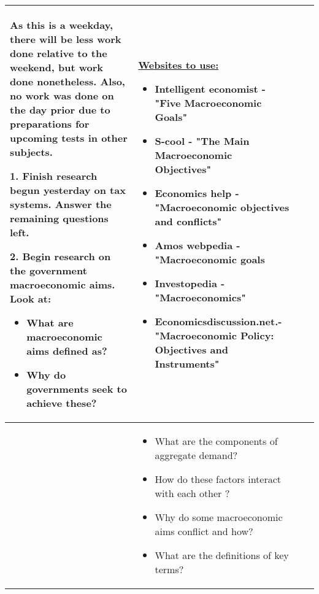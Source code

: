 \documentclass[12pt, a4paper]{article}
\newlength\combinedlength
\begin{document}
\begin{landscape}
\begin{longtable}{|m{5cm}|m{5cm}|m{5cm}|m{10.31cm}|}
{			 	As this is a weekday, there will be less work done relative to the weekend, but work done nonetheless. Also, no work was done on the day prior due to preparations for upcoming tests in other subjects.
			 	\newline
			 	
			 	1. Finish research begun yesterday on tax systems. Answer the remaining questions left.
			 	\newline
			 	
			 	2. Begin research on the government macroeconomic aims. Look at:
			 	
			 	\begin{itemize}
			 		\item What are macroeconomic aims defined as?
			 		\item Why do governments seek to achieve these?
			 	\end{itemize}
			 					} & 
		 	\textbf{\underline{Websites to use:}}
		 	\newline
		 	
		 	\begin{itemize}
		 		\item Intelligent economist - "Five Macroeconomic Goals"
		 		\item S-cool - "The Main Macroeconomic Objectives"
		 		\item Economics help - "Macroeconomic objectives and conflicts"
		 		\item Amos webpedia -"Macroeconomic goals
		 		\item  Investopedia - "Macroeconomics"
		 		\item Economicsdiscussion.net.- "Macroeconomic Policy: Objectives and Instruments"
		 	\end{itemize}
		 	
		 					
		 	\\
			\hline
			
			
				 &  \multicolumn{2}{m{\combinedlength}|}{

				\begin{itemize}

			 		\item What are the components of aggregate demand?
					\item How do these factors interact with each other ?
					\item Why do some macroeconomic aims conflict and how?
					\item What are the definitions of key terms?
				\end{itemize}
			} &
		

\end{longtable}
\end{landscape}
\end{document}
